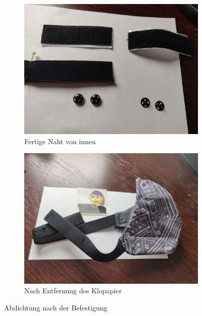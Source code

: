 \documentclass[12pt,parskip=full]{scrartcl}
\begin{document}
\begin{figure}[ht]
    \vspace{0.5cm}
    \centering
    \begin{subfigure}{0.48\textwidth}
        \centering
        \includegraphics[width = \linewidth]{Pictures/12_Fastener/Fastener1_resized.jpg}
        \caption{Fertige Naht von innen}
        \label{Fastener1}
    \end{subfigure}
    \begin{subfigure}{0.48\textwidth}
        \centering
        \includegraphics[width = \linewidth]{Pictures/12_Fastener/Fastener2_resized.jpg}
        \caption{Nach Entfernung des Klopapier}
        \label{Fastener2}
    \end{subfigure}
    \caption{Abdichtung nach der Befestigung}
    \label{Fastener}
\end{figure}
\end{document}
